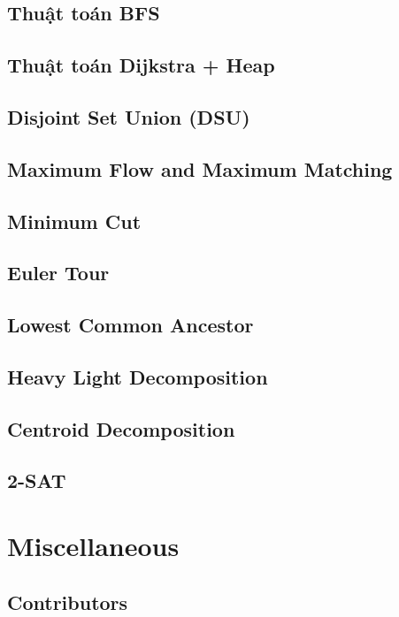 \documentclass{article}
\begin{document}
\subsection{Thuật toán BFS}

\subsection{Thuật toán Dijkstra + Heap}

\subsection{Disjoint Set Union (DSU)}

\subsection{Maximum Flow and Maximum Matching}

\subsection{Minimum Cut}
\subsection{Euler Tour}
\subsection{Lowest Common Ancestor}
\subsection{Heavy Light Decomposition}
\subsection{Centroid Decomposition}
\subsection{2-SAT}



\section{Miscellaneous}

\subsection{Contributors}



\printbibliography[heading=bibintoc]
	
\end{document}
